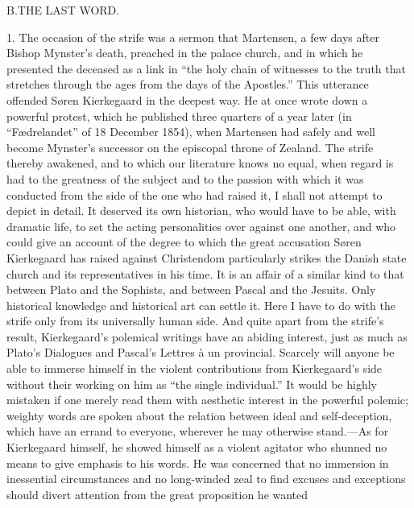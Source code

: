 \documentclass[12pt,a4paper]{book}
\newcommand{\opage}[1]{\marginnote{\footnotesize\textit{[#1]}}}
\begin{document}
\begin{center}B.\enspace THE LAST WORD.\end{center}

1. The occasion of the strife was a sermon that Martensen, a few days
after Bishop Mynster's death, preached in the palace church, and in
which he presented the deceased as a link in ``the holy chain of
witnesses to the truth that stretches through the ages from the days of
the Apostles.'' This utterance offended Søren Kierkegaard in the deepest
way. He at once wrote down a powerful protest, which he published three
quarters of a year later (in ``Fædrelandet'' of 18 December 1854), when
Martensen had safely and well become Mynster's successor on the
episcopal throne of Zealand. The strife thereby awakened, and to which
our literature knows no equal, when regard is had to the greatness of
the subject and to the passion with which it was conducted from the side
of the one who had raised it, I shall not attempt to depict in detail.
It deserved its own historian, who would have to be able, with dramatic
life, to set the acting personalities over against one another, and who
could give an account of the degree to which the great accusation Søren
Kierkegaard has raised against Christendom particularly strikes the
Danish state church and its representatives in his time. It is an
affair of a similar kind to that between Plato and the Sophists, and
between Pascal and the Jesuits. Only historical knowledge and historical
art can settle it. Here I have to do with the strife only from its
universally human side. And quite apart from the strife's result,
Kierkegaard's
\opage{144}polemical writings have an abiding interest, just as much as
Plato's Dialogues and Pascal's Lettres à un provincial. Scarcely will
anyone be able to immerse himself in the violent contributions from
Kierkegaard's side without their working on him as ``the single
individual.'' It would be highly mistaken if one merely read them with
aesthetic interest in the powerful polemic; weighty words are spoken
about the relation between ideal and self-deception, which have an
errand to everyone, wherever he may otherwise stand.---As for Kierkegaard
himself, he showed himself as a violent agitator who shunned no means to
give emphasis to his words. He was concerned that no immersion in
inessential circumstances and no long-winded zeal to find excuses and
exceptions should divert attention from the great proposition he wanted
\end{document}
